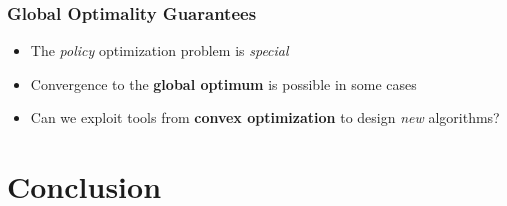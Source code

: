 \documentclass[aspectratio=169]{beamer}
\begin{document}
\begin{frame}
\frametitle{Global Optimality Guarantees}
\begin{overlayarea}{\textwidth}{\textheight}
\vspace{.5cm}
\begin{itemize}
	\setlength{\itemsep}{10pt}
	\item<1-> The \emph{policy} optimization problem is \emph{special}
	\item<2-> Convergence to the \textbf{global optimum} is possible in some cases~\citep{bhandari2019global,agarwal2019optimality,shani2019adaptive}
	\item<3-> Can we exploit tools from \textbf{convex optimization} to design \emph{new} algorithms?
\end{itemize}
\vspace{.5cm}
\end{overlayarea}
\end{frame}

\section{Conclusion}
\addtocounter{framenumber}{-1}
\frame{\tableofcontents[currentsection]}
\end{document}
